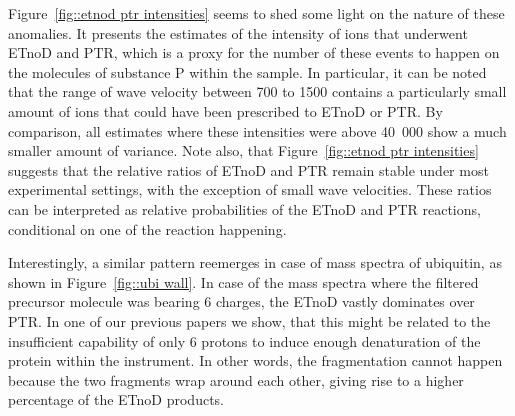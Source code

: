 \documentclass[journal=ancham, manuscript=article, layout=twocolumn]{achemso}
\begin{document}
Figure~\ref{fig::etnod ptr intensities} seems to shed some light on the nature of these anomalies. 
It presents the estimates of the intensity of ions that underwent ETnoD and PTR, which is a proxy for the number of these events to happen on the molecules of substance P within the sample. 
In particular, it can be noted that the range of wave velocity between 700 to 1500 contains a particularly small amount of ions that could have been prescribed to ETnoD or PTR. 
By comparison, all estimates where these intensities were above 40~000 show a much smaller amount of variance.  
Note also, that Figure~\ref{fig::etnod ptr intensities} suggests that the relative ratios of ETnoD and PTR remain stable under most experimental settings, with the exception of small wave velocities. 
These ratios can be interpreted as relative probabilities of the ETnoD and PTR reactions, conditional on one of the reaction happening.

Interestingly, a similar pattern reemerges in case of mass spectra of ubiquitin, as shown in Figure~\ref{fig::ubi wall}.
In case of the mass spectra where the filtered precursor molecule was bearing 6 charges, the ETnoD vastly dominates over PTR. 
In one of our previous papers\cite{lermyte2015understanding} we show, that this might be related to the insufficient capability of only 6 protons to induce enough denaturation of the protein within the instrument.
In other words, the fragmentation cannot happen because the two fragments wrap around each other, giving rise to a higher percentage of the ETnoD products. 
\end{document}
